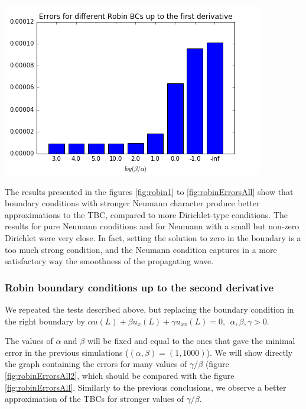 \begin{center}
		\includegraphics[scale=.6]{figures/robinErrors1.png}
\end{center}


\indent The results presented in the figures \ref{fig:robin1} to \ref{fig:robinErrorsAll} show that boundary conditions with stronger Neumann character produce better approximations to the TBC, compared to more Dirichlet-type conditions. The results for pure Neumann conditions and for Neumann with a small but non-zero Dirichlet were very close. In fact, setting the solution to zero in the boundary is a too much strong condition, and the Neumann condition captures in a more satisfactory way the smoothness of the propagating wave.

\subsubsection{Robin boundary conditions up to the second derivative}

\indent We repeated the tests described above, but replacing the boundary condition in the right boundary by $\alpha u(L) + \beta u_x(L) + \gamma u_{xx}(L) = 0,  \ \ \alpha,\beta, \gamma > 0$.

\indent The values of $\alpha$ and $\beta$ will be fixed and equal to the ones that gave the minimal error in the previous simulations ($(\alpha,\beta) = (1,1000)$). We will show directly the graph containing the errors for many values of $\gamma/\beta$ (figure \ref{fig:robinErrorsAll2}, which should be compared with the figure \ref{fig:robinErrorsAll}. Similarly to the previous conclusions, we observe a better approximation of the TBCs for stronger values of $\gamma/\beta$.

